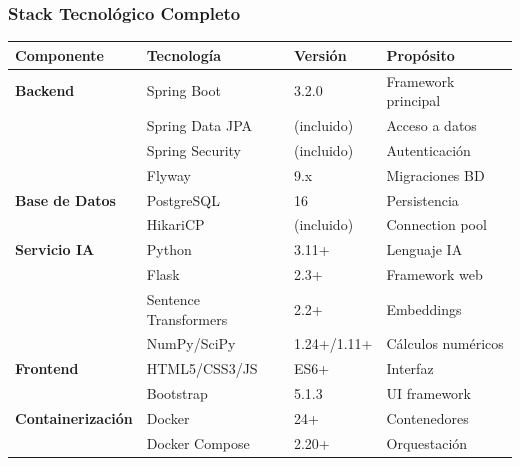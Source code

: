 \documentclass[aspectratio=169]{beamer}
\begin{document}
\begin{frame}
\frametitle{Stack Tecnológico Completo}

\begin{table}
\centering
\tiny
\begin{tabular}{p{2.5cm}p{2.5cm}p{3cm}p{3.5cm}}
\toprule
\textbf{Componente} & \textbf{Tecnología} & \textbf{Versión} & \textbf{Propósito} \\
\midrule
\textbf{Backend} & Spring Boot & 3.2.0 & Framework principal \\
& Spring Data JPA & (incluido) & Acceso a datos \\
& Spring Security & (incluido) & Autenticación \\
& Flyway & 9.x & Migraciones BD \\
\midrule
\textbf{Base de Datos} & PostgreSQL & 16 & Persistencia \\
& HikariCP & (incluido) & Connection pool \\
\midrule
\textbf{Servicio IA} & Python & 3.11+ & Lenguaje IA \\
& Flask & 2.3+ & Framework web \\
& Sentence Transformers & 2.2+ & Embeddings \\
& NumPy/SciPy & 1.24+/1.11+ & Cálculos numéricos \\
\midrule
\textbf{Frontend} & HTML5/CSS3/JS & ES6+ & Interfaz \\
& Bootstrap & 5.1.3 & UI framework \\
\midrule
\textbf{Containerización} & Docker & 24+ & Contenedores \\
& Docker Compose & 2.20+ & Orquestación \\
\bottomrule
\end{tabular}
\end{table}

\end{frame}
\end{document}

